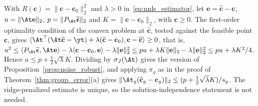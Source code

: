 With \(R(\mathbf c)=\|\mathbf c-\mathbf c_0\|_2^2\) and \(\lambda>0\)
in~\eqref{eq:nnls_estimator}, let \(\mathbf e=\widehat{\mathbf c}-\mathbf c\),
\(u=\|\At\mathbf e\|_2\), \(p=\|P_{\At}\widetilde{\boldsymbol\epsilon}\|_2\) and
\(K=\|\mathbf c-\mathbf c_0\|_2\), with \(\mathbf c\ge0\).  The first-order optimality
condition of the convex problem at \(\widehat{\mathbf c}\), tested against the feasible
point \(\mathbf c\), gives
\(\langle\At^\top(\At\widehat{\mathbf c}-\yt)+\lambda(\widehat{\mathbf c}-\mathbf c_0),
\mathbf c-\widehat{\mathbf c}\rangle\ge0\), that is,
\(u^2\le\langle P_{\At}\widetilde{\boldsymbol\epsilon},\At\mathbf e\rangle
-\lambda\langle\mathbf c-\mathbf c_0,\mathbf e\rangle-\lambda\|\mathbf e\|_2^2
\le pu+\lambda K\|\mathbf e\|_2-\lambda\|\mathbf e\|_2^2\le pu+\lambda K^2/4\).  Hence
\(u\le p+\tfrac12\sqrt\lambda K\).  Dividing by \(\sigma_J(\At)\) gives the version of
Proposition~\ref{prop:noise_robust}, and applying \(\pi_g\) as in the proof of
Theorem~\ref{thm:group_error}(a) gives
\(\|\At_g(\widehat{\mathbf c}_g-\mathbf c_g)\|_2\le(p+\tfrac12\sqrt\lambda K)/s_g\).
The ridge-penalized estimate is unique, so the solution-independence statement is not
needed.

% 
% 
